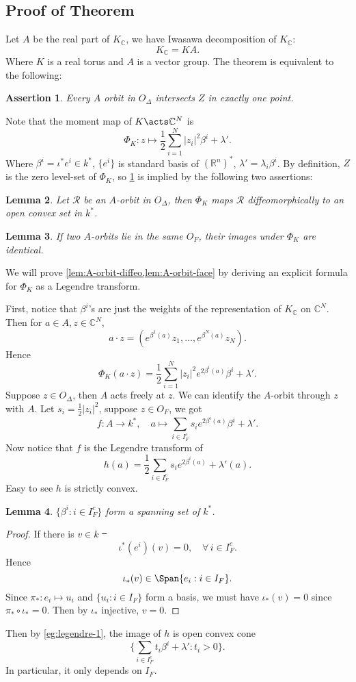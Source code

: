 \documentclass[12pt]{article}
\theoremstyle{plain}\newtheorem{theorem}{Theorem}
\theoremstyle{definition}\newtheorem{definition}[theorem]{Definition}
\theoremstyle{definition}\newtheorem{example}[theorem]{Example}
\theoremstyle{plain}\newtheorem{axiom}[theorem]{Axiom}
\theoremstyle{plain}\newtheorem{assertion}[theorem]{Assertion}
\theoremstyle{plain}\newtheorem{corollary}[theorem]{Corollary}
\theoremstyle{plain}\newtheorem{lemma}[theorem]{Lemma}
\theoremstyle{plain}\newtheorem{proposition}[theorem]{Proposition}
\theoremstyle{plain}\newtheorem{prop}[theorem]{Proposition}
\theoremstyle{plain}\newtheorem{conjecture}[theorem]{Conjecture}
\theoremstyle{plain}\newtheorem{conj}[theorem]{Conjecture}
\theoremstyle{plain}\newtheorem{problem}[theorem]{Problem}
\theoremstyle{remark}\newtheorem{notation}[theorem]{Notation}
\theoremstyle{definition}\newtheorem*{question}{Question}
\theoremstyle{definition}\newtheorem*{answer}{Answer}
\theoremstyle{definition}\newtheorem*{goal}{Goal}
\theoremstyle{plain}\newtheorem*{application}{Application}
\theoremstyle{plain}\newtheorem*{exercise}{Exercise}
\theoremstyle{remark}\newtheorem*{remark}{Remark}
\theoremstyle{remark}\newtheorem*{note}{\small{Note}}
\numberwithin{equation}{section}
\numberwithin{theorem}{section}
\numberwithin{figure}{section}
\begin{document}
\subsection{Proof of Theorem}
Let \(A\) be the real part of \(K_{\mathbb{C}}\), we have Iwasawa decomposition of
\(K_{\mathbb{C}}\): \[
    K_{\mathbb{C}}=KA
.\] Where \(K\) is a real torus and \(A\) is a vector group. The theorem is
equivalent to the following:
\begin{assertion}\label{ass:A-orbit-intersect}
    Every \(A\) orbit in \(O_{\Delta}\) intersects \(Z\) in exactly one point.
\end{assertion}
Note that the moment map of \(K\acts \mathbb{C}^N\) is \[
    \Phi_K\colon z\longmapsto \frac{1}{2}\sum_{i=1}^N |z_i|^2\beta^i+\lambda'
.\] Where \(\beta^i=\iota^* e^i\in k^*\), \(\{e^i\}\) is standard basis of
\((\mathbb{R}^n)^*\), \(\lambda'=\lambda_i \beta^i\). By definition, \(Z\) is the
zero level-set of \(\Phi_K\), so \cref{ass:A-orbit-intersect} is implied by the
following two assertions:
\begin{lemma}\label{lem:A-orbit-diffeo}
    Let \(\mathcal{R}\) be an \(A\)-orbit in \(O_\Delta\), then \(\Phi_K\) maps
    \(\mathcal{R}\) diffeomorphically to an open convex set in \(k^*\).
\end{lemma}
\begin{lemma}\label{lem:A-orbit-face}
    If two \(A\)-orbits lie in the same \(O_F\), their images under \(\Phi_K\)
    are identical.
\end{lemma}
We will prove \cref{lem:A-orbit-diffeo,lem:A-orbit-face} by deriving an explicit
formula for \(\Phi_K\) as a Legendre transform.

First, notice that \(\beta^i\)'s are just the weights of the representation of 
\(K_{\mathbb{C}}\) on \(\mathbb{C}^N\). Then for \(a\in A,z\in \mathbb{C}^N\), \[
    a\cdot z=(e^{\beta^1(a)}z_1,\ldots,e^{\beta^N(a)}z_N)
.\] Hence \[
    \Phi_K(a\cdot z)=\frac{1}{2}\sum_{i=1}^N|z_i|^2e^{2\beta^i(a)}\beta^i+\lambda'
.\] Suppose \(z\in O_\Delta\), then \(A\) acts freely at \(z\). We can identify
the \(A\)-orbit through \(z\) with \(A\). Let \(s_i=\frac{1}{2}|z_i|^2\), suppose
\(z\in O_F\), we got \[
    f\colon A\to k^*,\quad
    a\longmapsto \sum_{i\in I_F^c} s_i e^{2\beta^i(a)}\beta^i+\lambda'
.\] Now notice that \(f\) is the Legendre transform of \[
    h(a)=\frac{1}{2}\sum_{i\in I_F^c}s_i e^{2\beta^i(a)}+\lambda'(a)
.\] Easy to see \(h\) is strictly convex. 
\begin{lemma}
    \(\{\beta^i:i\in I_F^c\}\) form a spanning set of \(k^*\).
\end{lemma}
\begin{proof}
    If there is \(v\in k\) \st\ \[
        \iota^*(e^i)(v)=0,\quad\forall\,i\in I_F^c
    .\] Hence \[
        \iota_*(v)\in \Span\{e_i:i\in I_F\}
    .\] Since \(\pi_*\colon e_i\mapsto u_i\) and \(\{u_i:i\in I_F\}\) form a basis,
    we must have \(\iota_*(v)=0\) since \(\pi_*\circ \iota_*=0\). Then by \(\iota_*\)
    injective, \(v=0\).
\end{proof}
Then by \cref{eg:legendre-1}, the image of \(h\) is open convex cone \[
    \Big\{\sum_{i\in I_F^c}t_i\beta^i+\lambda':t_i>0\Big\}
.\] In particular, it only depends on \(I_F\).
\end{document}
